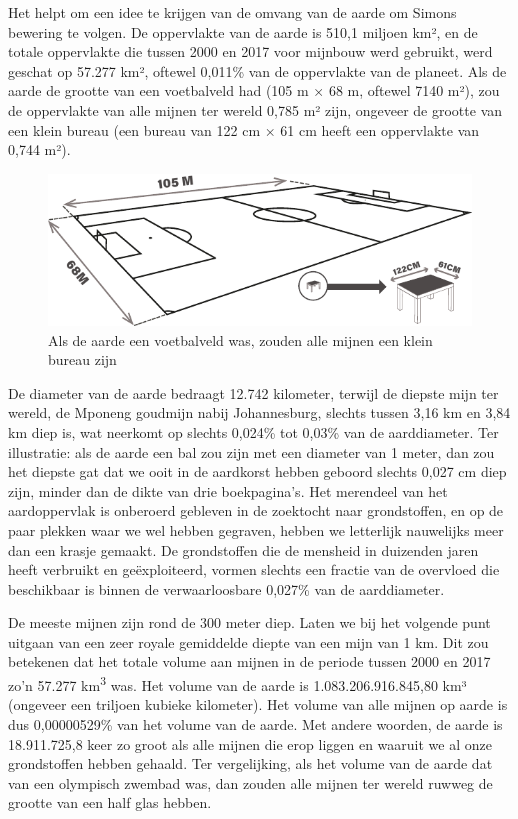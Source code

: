 Het helpt om een idee te krijgen van de omvang van de aarde om Simons
bewering te volgen. De oppervlakte van de aarde is 510,1 miljoen km², en
de totale oppervlakte die tussen 2000 en 2017 voor mijnbouw werd
gebruikt, werd geschat op 57.277 km², oftewel 0,011\% van de oppervlakte
van de planeet.\autocite{31} Als de
aarde de grootte van een voetbalveld had (105 m × 68 m, oftewel 7140 m²),
zou de oppervlakte van alle mijnen ter wereld 0,785 m² zijn, ongeveer de
grootte van een klein bureau (een bureau van 122 cm × 61 cm heeft een
oppervlakte van 0,744 m²).

\begin{figure}[!htb]
\centering
    \includegraphics[width=\textwidth]{figures/fig2.pdf}
\caption[Als de aarde een voetbalveld was, zouden alle mijnen
een klein bureau zijn]{Als de aarde een voetbalveld was, zouden alle mijnen
een klein bureau zijn}
\label{fig2}
\end{figure}

De diameter van de aarde bedraagt 12.742 kilometer, terwijl de diepste mijn ter wereld, de Mponeng goudmijn nabij Johannesburg, slechts tussen 3,16 km en 3,84 km diep is, wat neerkomt op slechts 0,024\% tot 0,03\% van de aarddiameter. Ter illustratie: als de aarde een bal zou zijn met een diameter van 1 meter, dan zou het diepste gat dat we ooit in de aardkorst hebben geboord slechts 0,027 cm diep zijn, minder dan de dikte van drie boekpagina’s. Het merendeel van het aardoppervlak is onberoerd gebleven in de zoektocht naar grondstoffen, en op de paar plekken waar we wel hebben gegraven, hebben we letterlijk nauwelijks meer dan een krasje gemaakt. De grondstoffen die de mensheid in duizenden jaren heeft verbruikt en geëxploiteerd, vormen slechts een fractie van de overvloed die beschikbaar is binnen de verwaarloosbare 0,027\% van de aarddiameter.

De meeste mijnen zijn rond de 300 meter diep. Laten we bij het volgende
punt uitgaan van een zeer royale gemiddelde diepte van een mijn van 1
km. Dit zou betekenen dat het totale volume aan mijnen in de periode
tussen 2000 en 2017 zo'n 57.277 km\textsuperscript{3} was. Het volume van de aarde is
1.083.206.916.845,80 km³ (ongeveer een triljoen kubieke kilometer). Het
volume van alle mijnen op aarde is dus 0,00000529\% van het volume van
de aarde. Met andere woorden, de aarde is 18.911.725,8 keer zo groot als
alle mijnen die erop liggen en waaruit we al onze grondstoffen hebben
gehaald. Ter vergelijking, als het volume van de aarde dat van een
olympisch zwembad was, dan zouden alle mijnen ter wereld ruwweg de
grootte van een half glas hebben.\autocite{32}

